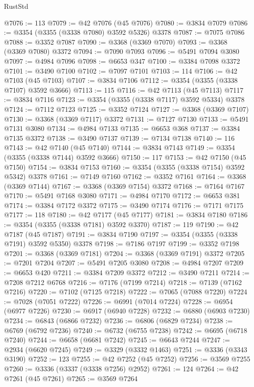 \begin{lexlean}{RustStd}
\begin{coremodule}
@7076 := 113
@7079 := @42 @7076 (@45 @7076)
@7080 := @3834 @7079
@7086 := @3354 (@3355 (@3338 @7080) @3592 @5326) @3378
@7087 := @7075 @7086
@7088 := @3352 @7087
@7090 := @3368 (@3369 @7070)
@7093 := @3368 (@3369 @7080) @3372
@7094 := @7090 @7093
@7096 := @5491 @7094 @3080
@7097 := @4984 @7096
@7098 := @6653 @347
@7100 := @3384 @7098 @3372
@7101 := @3490 @7100
@7102 := @7097 @7101
@7103 := 114
@7106 := @42 @7103 (@45 @7103)
@7107 := @3834 @7106
@7112 := @3354 (@3355 (@3338 @7107) @3592 @3666)
@7113 := 115
@7116 := @42 @7113 (@45 @7113)
@7117 := @3834 @7116
@7123 := @3354 (@3355 (@3338 @7117) @3592 @5334) @3378
@7124 := @7112 @7123
@7125 := @3352 @7124
@7127 := @3368 (@3369 @7107)
@7130 := @3368 (@3369 @7117) @3372
@7131 := @7127 @7130
@7133 := @5491 @7131 @3080
@7134 := @4984 @7133
@7135 := @6653 @368
@7137 := @3384 @7135 @3372
@7138 := @3490 @7137
@7139 := @7134 @7138
@7140 := 116
@7143 := @42 @7140 (@45 @7140)
@7144 := @3834 @7143
@7149 := @3354 (@3355 (@3338 @7144) @3592 @3666)
@7150 := 117
@7153 := @42 @7150 (@45 @7150)
@7154 := @3834 @7153
@7160 := @3354 (@3355 (@3338 @7154) @3592 @5342) @3378
@7161 := @7149 @7160
@7162 := @3352 @7161
@7164 := @3368 (@3369 @7144)
@7167 := @3368 (@3369 @7154) @3372
@7168 := @7164 @7167
@7170 := @5491 @7168 @3080
@7171 := @4984 @7170
@7172 := @6653 @381
@7174 := @3384 @7172 @3372
@7175 := @3490 @7174
@7176 := @7171 @7175
@7177 := 118
@7180 := @42 @7177 (@45 @7177)
@7181 := @3834 @7180
@7186 := @3354 (@3355 (@3338 @7181) @3592 @3370)
@7187 := 119
@7190 := @42 @7187 (@45 @7187)
@7191 := @3834 @7190
@7197 := @3354 (@3355 (@3338 @7191) @3592 @5350) @3378
@7198 := @7186 @7197
@7199 := @3352 @7198
@7201 := @3368 (@3369 @7181)
@7204 := @3368 (@3369 @7191) @3372
@7205 := @7201 @7204
@7207 := @5491 @7205 @3080
@7208 := @4984 @7207
@7209 := @6653 @420
@7211 := @3384 @7209 @3372
@7212 := @3490 @7211
@7214 := @7208 @7212 @6768
@7216 := @7176 (@7199 @7214)
@7218 := @7139 (@7162 @7216)
@7220 := @7102 (@7125 @7218)
@7222 := @7065 (@7088 @7220)
@7224 := @7028 (@7051 @7222)
@7226 := @6991 (@7014 @7224)
@7228 := @6954 (@6977 @7226)
@7230 := @6917 (@6940 @7228)
@7232 := @6880 (@6903 @7230)
@7234 := @6843 (@6866 @7232)
@7236 := @6806 (@6829 @7234)
@7238 := @6769 (@6792 @7236)
@7240 := @6732 (@6755 @7238)
@7242 := @6695 (@6718 @7240)
@7244 := @6658 (@6681 @7242)
@7245 := @6643 @7244
@7247 := @2934 (@6620 @7245)
@7249 := @3329 (@3332 @1463)
@7251 := @3336 (@3343 @3190)
@7252 := 123
@7255 := @42 @7252 (@45 @7252)
@7256 := @3569 @7255
@7260 := @3336 (@3337 (@3338 @7256) @2952)
@7261 := 124
@7264 := @42 @7261 (@45 @7261)
@7265 := @3569 @7264

\end{coremodule}
\end{lexlean}
